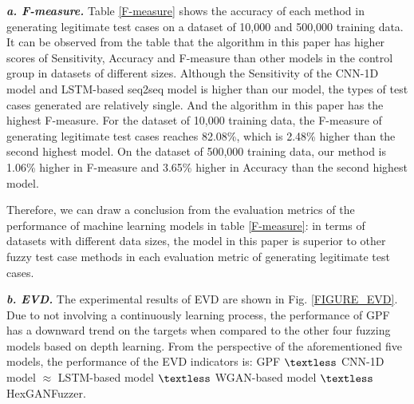 \textit{\textbf{a. F-measure.}} Table \ref{F-measure} shows the accuracy of each method in generating legitimate test cases on a dataset of 10,000 and 500,000 training data. It can be observed from the table that the algorithm in this paper has higher scores of Sensitivity, Accuracy and F-measure than other models in the control group in datasets of different sizes. Although the Sensitivity of the CNN-1D model and LSTM-based seq2seq model is higher than our model, the types of test cases generated are relatively single. And the algorithm in this paper has the highest F-measure. For the dataset of 10,000 training data, the F-measure of generating legitimate test cases reaches 82.08\%, which is 2.48\% higher than the second highest model. On the dataset of 500,000 training data, our method is 1.06\% higher in F-measure and 3.65\% higher in Accuracy than the second highest model. 

Therefore, we can draw a conclusion from the evaluation metrics of the performance of machine learning models in table \ref{F-measure}: in terms of datasets with different data sizes, the model in this paper is superior to other fuzzy test case methods in each evaluation metric of generating legitimate test cases.


\textit{\textbf{b. EVD.}}
The experimental results of EVD are shown in Fig. \ref{FIGURE_EVD}. Due to not involving a continuously learning process, the performance of GPF has a downward trend on the targets when compared to the other four fuzzing models based on depth learning. From the perspective of the aforementioned five models, the performance of the EVD indicators is: GPF $\textless$ CNN-1D model $\approx$ LSTM-based model $\textless$ WGAN-based model $\textless$ HexGANFuzzer. 




